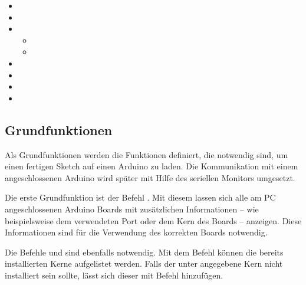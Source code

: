 \begin{itemize}
    \begin{itemize}
      \item {}
      \item {}
      \item {}
      \item {}
      \item {}
      \item {}
      \item {}
      \item {}
      \item {}
    \end{itemize}
  \item {}
  \item {}
  \item {}
    \begin{itemize}
      \item {}
      \item {}
    \end{itemize}
  \item {}
  \item {}
  \item {}
  \item {}
\end{itemize}


\subsection{Grundfunktionen}

Als Grundfunktionen werden die Funktionen definiert, die notwendig sind, um einen fertigen Sketch auf einen Arduino zu laden. Die Kommunikation mit einem angeschlossenen Arduino wird später mit Hilfe des seriellen Monitors umgesetzt. 

\bigskip

Die erste Grundfunktion ist der Befehl . Mit diesem lassen sich alle am PC angeschlossenen Arduino Boards mit zusätzlichen Informationen -- wie beispielsweise dem verwendeten Port oder dem Kern des Boards -- anzeigen. Diese Informationen sind für die Verwendung des korrekten Boards  notwendig.


Die Befehle  und  sind ebenfalls notwendig. Mit dem Befehl  können die bereits installierten Kerne aufgelistet werden. Falls der unter  angegebene Kern nicht installiert sein sollte, lässt sich dieser mit Befehl  hinzufügen. 

